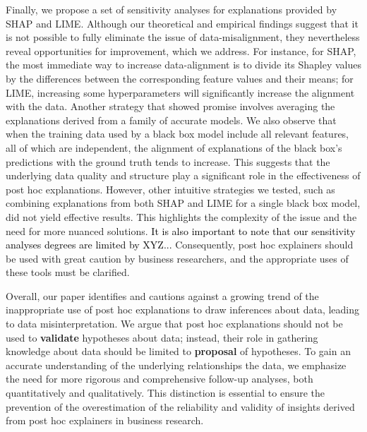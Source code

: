 \documentclass[mnsc,blindrev]{informs3}
\begin{document}
Finally, we propose a set of sensitivity analyses for explanations provided by SHAP and LIME. Although our theoretical and empirical findings suggest that it is not possible to fully eliminate the issue of data-misalignment, they nevertheless reveal opportunities for improvement, which we address. For instance, for SHAP, the most immediate way to increase data-alignment is to divide its Shapley values by the differences between the corresponding feature values and their means; for LIME, increasing some hyperparameters will significantly increase the alignment with the data.
Another strategy that showed promise involves averaging the explanations derived from a family of accurate models. We also observe that when the training data used by a black box model include all relevant features, all of which are independent, the alignment of explanations of the black box's predictions with the ground truth tends to increase. This suggests that the underlying data quality and structure play a significant role in the effectiveness of post hoc explanations.
However, other intuitive strategies we tested, such as combining explanations from both SHAP and LIME for a single black box model, did not yield effective results. This highlights the complexity of the issue and the need for more nuanced solutions.
\textcolor{black}{It is also important to note that our sensitivity analyses degrees are limited by XYZ...} Consequently, post hoc explainers should be used with great caution by business researchers, and the appropriate uses of these tools must be clarified.


Overall, our paper identifies and cautions against a growing trend of the inappropriate use of post hoc explanations to draw inferences about data, leading to data misinterpretation. We argue that post hoc explanations should not be used to \textbf{validate} hypotheses about data; instead, their role in gathering knowledge about data should be limited to \textbf{proposal} of hypotheses. To gain an accurate understanding of the underlying relationships  the data, we emphasize the need for more rigorous and comprehensive follow-up analyses, both quantitatively and qualitatively. This distinction is essential to ensure the prevention of the overestimation of the reliability and validity of insights derived from post hoc explainers in business research.
\end{document}
